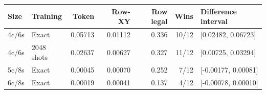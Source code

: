 \begin{tabular}{llrrrrl}
\toprule
Size & Training & Token & Row-XY & Row legal & Wins & Difference interval\\
\midrule
4c/6s & Exact & 0.05713 & 0.01112 & 0.336 & 10/12 & [0.02482, 0.06723]\\
4c/6s & 2048 shots & 0.02637 & 0.00627 & 0.327 & 11/12 & [0.00725, 0.03294]\\
5c/8s & Exact & 0.00045 & 0.00070 & 0.252 & 7/12 & [-0.00177, 0.00081]\\
6c/8s & Exact & 0.00019 & 0.00041 & 0.137 & 4/12 & [-0.00078, 0.00010]\\
\bottomrule
\end{tabular}
